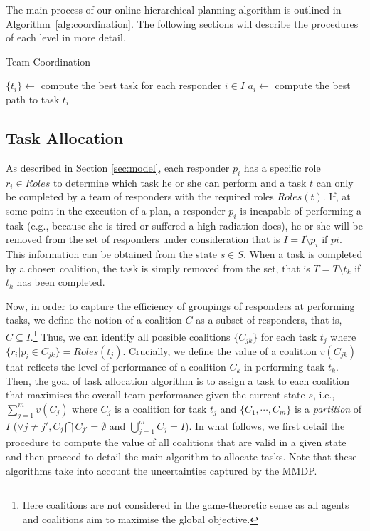 The main process of our online hierarchical planning algorithm is
outlined in Algorithm~\ref{alg:coordination}. The following
sections will describe the procedures of each level in more detail.

\begin{algorithm}[t]
  \caption{Team Coordination}\small
  \label{alg:coordination}
  \Indm
  \Indp\BlankLine
  $\{ t_i \} \gets$ compute the best task for each responder $i\in I$ \;
   {
    $a_i \gets$ compute the best path to task $t_i$ \;
  }
\end{algorithm}

\subsection{Task Allocation}
\label{sec:taskplanning}

\noindent As described in Section \ref{sec:model}, each responder
$p_i$ has a specific role $r_i \in Roles$ to determine which task
he or she can perform and  a task $t$ can only be completed by a
team of responders with the required roles $Roles(t)$. If, at some
point in the execution of a plan, a responder $p_i$ is incapable of
performing a task (e.g., because she is tired or suffered a high
radiation does), he or she will be removed from the set of
responders under consideration that is $I = I \setminus p_i$ if
$pi$. This information can be obtained from the state $s \in S$.
When a task is completed by a chosen coalition, the task is simply
removed from the set, that is $T = T\setminus t_k$ if $t_k$ has
been completed.

Now, in order to capture the efficiency of groupings of responders
at performing tasks, we define the notion of a coalition $C$ as a
subset of responders, that is, $C \subseteq I$.\footnote{Here
coalitions are not considered in the game-theoretic sense as all
agents and coalitions aim to maximise the global objective.} Thus,
we can identify all possible coalitions $\{ C_{jk} \}$ for each
task $t_j$ where $\{r_i | p_i \in C_{jk}\} = Roles(t_j)$.
Crucially, we define the value of a coalition $v(C_{jk})$ that
reflects the level of performance of a coalition $C_k$ in
performing task $t_k$.  Then, the goal of task allocation algorithm
is to assign a task to each coalition that maximises the overall
team performance given the current state $s$, i.e., $\sum_{j=1}^m
v(C_j)$ where $C_j$ is a coalition for task $t_j$ and $\{ C_1,
\cdots, C_m \}$ is a {\em partition} of $I$ ($\forall j\neq j', C_j
\bigcap C_{j'} = \emptyset$ and $\bigcup_{j=1}^m C_j=I$). In what
follows, we first detail the procedure to compute the value of all
coalitions that are valid in a given state and then proceed to
detail the main algorithm to allocate tasks. Note that these
algorithms take into account the uncertainties captured by the
MMDP.


